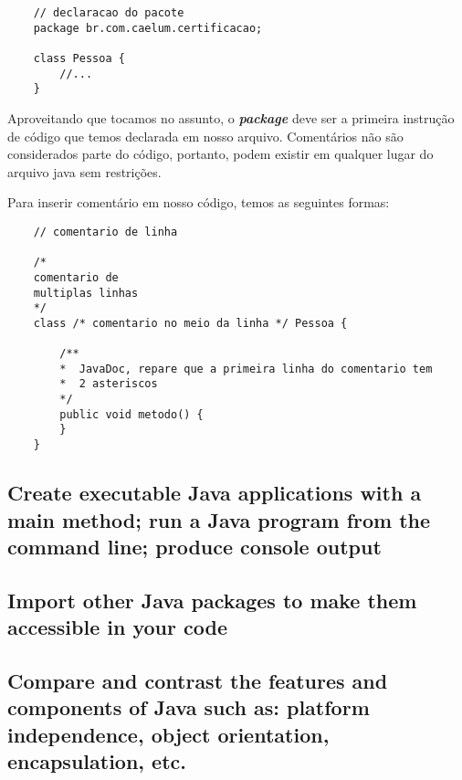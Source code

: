 \documentclass[12pt]{report}
\begin{document}
\begin{lstlisting}
	// declaracao do pacote
	package br.com.caelum.certificacao;
	
	class Pessoa {
		//...
	}
\end{lstlisting}

Aproveitando que tocamos no assunto, o \textbf{\textit{package}} deve ser a primeira instrução de código que temos declarada em nosso arquivo. Comentários não são considerados parte do código, portanto, podem existir em qualquer lugar do arquivo java sem restrições.

\pagebreak
Para inserir comentário em nosso código, temos as seguintes formas:

\begin{lstlisting}
	// comentario de linha
	
	/*
	comentario de
	multiplas linhas
	*/
	class /* comentario no meio da linha */ Pessoa {
		
		/**
		*  JavaDoc, repare que a primeira linha do comentario tem
		*  2 asteriscos
		*/
		public void metodo() {
		}
	}
\end{lstlisting}


\subsection*{Create executable Java applications with a main method; run a Java program from the command line; produce console output}
\subsection*{Import other Java packages to make them accessible in your code}
\subsection*{Compare and contrast the features and components of Java such as: platform independence, object orientation, encapsulation, etc.}

	
\end{document}

